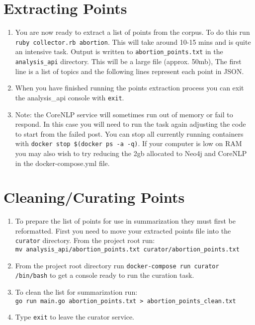 \section{Extracting Points}
\begin{enumerate}
	\item{You are now ready to extract a list of points from the corpus. To do this run \texttt{ruby collector.rb abortion}. This will take around 10-15 mins and is quite an intensive task. Output is written to \texttt{abortion\_points.txt} in the \texttt{analysis\_api} directory. This will be a large file (approx. 50mb), The first line is a list of topics and the following lines represent each point in JSON.}
	\item{When you have finished running the points extraction process you  can exit the analysis\_api console with \texttt{exit}.}
    \item{Note: the CoreNLP service will sometimes run out of memory or fail to respond. In this case you will need to run the task again adjusting the code to start from the failed post. You can stop all currently running containers with \texttt{docker stop \$(docker ps -a -q)}. If your computer is low on RAM you may also wish to try reducing the 2gb allocated to Neo4j and CoreNLP in the docker-compose.yml file.}
\end{enumerate}

\section{Cleaning/Curating Points}
\begin{enumerate}
	\item{To prepare the list of points for use in summarization they must first be reformatted. First you need to move your extracted points file into the \texttt{curator} directory. From the project root run: \\ \texttt{mv analysis\_api/abortion\_points.txt curator/abortion\_points.txt}}
	\item{From the project root directory run \texttt{docker-compose run curator /bin/bash} to get a console ready to run the curation task.}
	\item{To clean the list for summarization run: \\ \texttt{go run main.go abortion\_points.txt > abortion\_points\_clean.txt}}
    \item{Type \texttt{exit} to leave the curator service.}
\end{enumerate}

